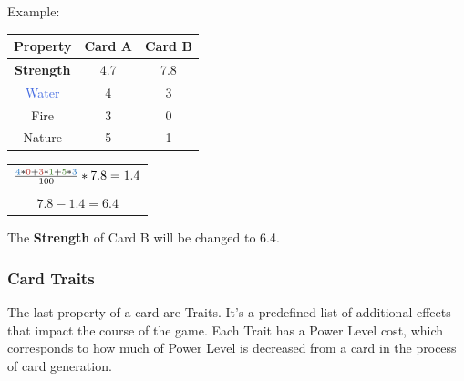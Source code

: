 \documentclass{article}
\begin{document}
    \begin{flushleft}
        Example: 
    \end{flushleft}
    
    \begin{center}
    \begin{tabular}{|c|c|c|}
    \hline
        Property & Card A & Card B  \\
    \hline
        \textbf{Strength} & 4.7 & 7.8 \\
    \hline
        \textcolor{RoyalBlue}{Water} & 4 & 3 \\
    \hline
        \textcolor{BrickRed}{Fire} & 3 & 0 \\
    \hline
        \textcolor{OliveGreen}{Nature} & 5 & 1 \\
    \hline
    \end{tabular}
    \begin{tabular}{c}
    $\frac{\textcolor{RoyalBlue}{4} * \textcolor{BrickRed}{0} + \textcolor{BrickRed}{3} * \textcolor{OliveGreen}{1} + 
    \textcolor{OliveGreen}{5} * \textcolor{RoyalBlue}{3}}{100}*7.8 = 1.4$\\ \\ $7.8 - 1.4 = 6.4$
    \end{tabular}
    \end{center}
    \begin{flushleft}
    The \textbf{Strength} of Card B will be changed to 6.4.
    \end{flushleft}
   
        
      
         
    
\subsubsection{Card Traits}

    The last property of a card are Traits. It's a predefined list of additional effects that impact the course of the game. Each Trait has a Power Level cost, which corresponds to how much of Power Level is decreased from a card in the process of card generation. 
    
\end{document}
